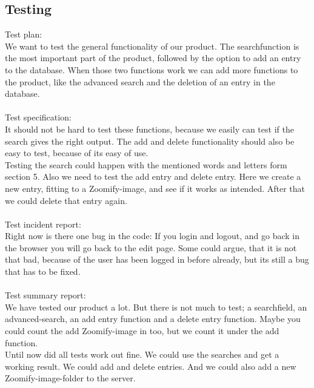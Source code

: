 \documentclass[12pt,a4paper]{article}
\begin{document}
\subsection{Testing}
Test plan: \\
We want to test the general functionality of our product. The searchfunction is the most important part of the product, followed by the option to add an entry to the database. When those two functions work we can add more functions to the product, like the advanced search and the deletion of an entry in the database.\\\\
Test specification:\\
It should not be hard to test these functions, because we easily can test if the search gives the right output. The add and delete functionality should also be easy to test, because of its easy of use.\\
Testing the search could happen with the mentioned words and letters form section 5. Also we need to test the add entry and delete entry. Here we create a new entry, fitting to a Zoomify-image, and see if it works as intended. After that we could delete that entry again.\\\\
Test incident report:\\
Right now is there one bug in the code: If you login and logout, and go back in the browser you will go back to the edit page. Some could argue, that it is not that bad, because of the user has been logged in before already, but its still a bug that has to be fixed.\\\\
Test summary report:\\
We have tested our product a lot. But there is not much to test; a searchfield, an advanced-search, an add entry function and a delete entry function. Maybe you could count the add Zoomify-image in too, but we count it under the add function.\\
Until now did all tests work out fine. We could use the searches and get a working result. We could add and delete entries. And we could also add a new Zoomify-image-folder to the server.
\newpage
\end{document}
